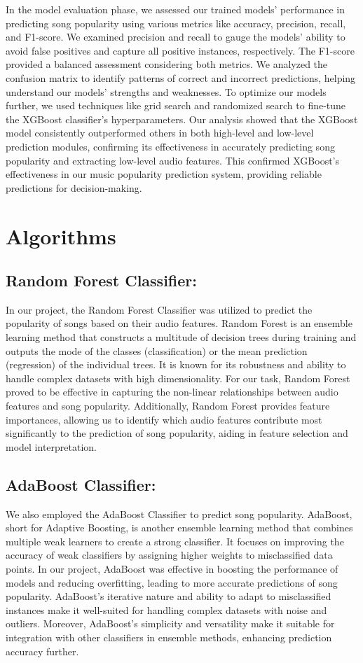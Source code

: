\documentclass[11pt]{report}
\begin{document}
In the model evaluation phase, we assessed our trained models' performance in predicting song popularity using various metrics like accuracy, precision, recall, and F1-score. We examined precision and recall to gauge the models' ability to avoid false positives and capture all positive instances, respectively. The F1-score provided a balanced assessment considering both metrics. We analyzed the confusion matrix to identify patterns of correct and incorrect predictions, helping understand our models' strengths and weaknesses. To optimize our models further, we used techniques like grid search and randomized search to fine-tune the XGBoost classifier's hyperparameters. Our analysis showed that the XGBoost model consistently outperformed others in both high-level and low-level prediction modules, confirming its effectiveness in accurately predicting song popularity and extracting low-level audio features.
This confirmed XGBoost's effectiveness in our music popularity prediction system, providing reliable predictions for decision-making.

\section{Algorithms}

\subsection{Random Forest Classifier:}
  In our project, the Random Forest Classifier was utilized to predict the popularity of songs based on their audio features. Random Forest is an ensemble learning method that constructs a multitude of decision trees during training and outputs the mode of the classes (classification) or the mean prediction (regression) of the individual trees. It is known for its robustness and ability to handle complex datasets with high dimensionality. For our task, Random Forest proved to be effective in capturing the non-linear relationships between audio features and song popularity. Additionally, Random Forest provides feature importances, allowing us to identify which audio features contribute most significantly to the prediction of song popularity, aiding in feature selection and model interpretation.


\subsection{AdaBoost Classifier:}
   We also employed the AdaBoost Classifier to predict song popularity. AdaBoost, short for Adaptive Boosting, is another ensemble learning method that combines multiple weak learners to create a strong classifier. It focuses on improving the accuracy of weak classifiers by assigning higher weights to misclassified data points. In our project, AdaBoost was effective in boosting the performance of models and reducing overfitting, leading to more accurate predictions of song popularity. AdaBoost's iterative nature and ability to adapt to misclassified instances make it well-suited for handling complex datasets with noise and outliers. Moreover, AdaBoost's simplicity and versatility make it suitable for integration with other classifiers in ensemble methods, enhancing prediction accuracy further.
\end{document}
